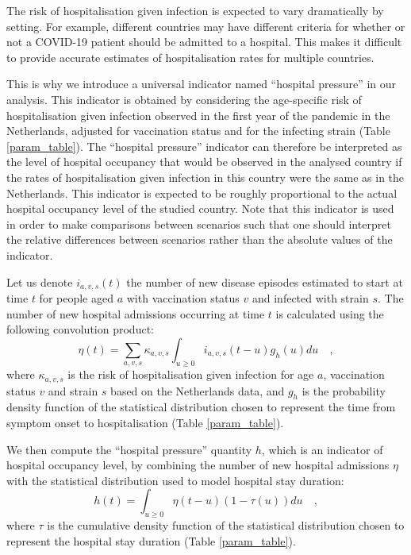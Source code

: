 The risk of hospitalisation given infection is expected to vary dramatically by setting.
For example, different countries may have different criteria for whether or not a COVID-19 
patient should be admitted to a hospital. This makes it difficult to provide accurate 
estimates of hospitalisation rates for multiple countries. 

This is why we introduce a universal indicator named ``hospital pressure'' in our analysis. This indicator
is obtained by considering the age-specific risk of hospitalisation given infection observed in the first year
of the pandemic in the Netherlands, adjusted for vaccination status and for the infecting strain (Table \ref{param_table}).
The ``hospital pressure'' indicator can therefore be interpreted as the level of hospital occupancy that
would be observed in the analysed country if the rates of hospitalisation given infection in this country were the same
as in the Netherlands. This indicator is expected to be roughly proportional to the actual hospital occupancy level of the 
studied country. Note that this indicator is used in order to make comparisons between scenarios such that one should interpret the relative
differences between scenarios rather than the absolute values of the indicator. 

Let us denote $i_{a,v,s}(t)$ the number of new disease episodes estimated to start at time $t$ for people aged $a$ with vaccination status $v$
and infected with strain $s$. The number of new hospital admissions occurring at time $t$ is calculated using the following
convolution product:
\begin{equation}
 \eta(t) = \sum_{a,v,s} \kappa_{a,v,s} \int_{u \geq 0}  i_{a,v,s}(t-u)g_{h}(u) du   \quad,
 \end{equation}
where $\kappa_{a,v,s}$ is the risk of hospitalisation given infection for age $a$, vaccination status $v$ and strain $s$ 
based on the Netherlands data, and $g_h$ is the probability density function of the statistical distribution chosen to represent the 
time from symptom onset to hospitalisation (Table \ref{param_table}). 

We then compute the ``hospital pressure'' quantity $h$, which is an indicator of hospital occupancy level, by combining the number of new 
hospital admissions $\eta$ with the statistical distribution used to model hospital stay duration:
\begin{equation}
h(t) = \int_{u \geq 0}  \eta(t-u) (1 - \tau(u)) du   \quad,
\end{equation}
where $\tau$ is the cumulative density function of the statistical distribution chosen to represent the 
hospital stay duration (Table \ref{param_table}). 
